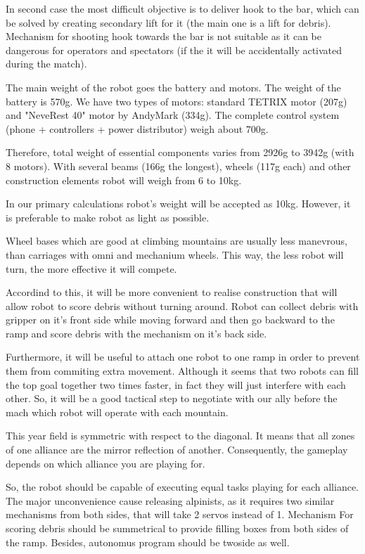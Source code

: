 \begin{enumerate*}
		In second case the most difficult objective is to deliver hook to the bar, which can be solved by creating secondary lift for it (the main one is a lift for debris). Mechanism for shooting hook towards the bar is not suitable as it can be dangerous for operators and spectators (if the it will be accidentally activated during the match).\newline
		\item The main weight of the robot goes the battery and motors. The weight of the battery is 570g. We have two types of motors: standard TETRIX motor (207g) and "NeveRest 40" motor by AndyMark (334g). The complete control system (phone + controllers + power distributor) weigh about 700g.
		
		Therefore, total weight of essential components varies from 2926g to 3942g (with 8 motors). With several beams (166g the longest), wheels (117g each) and other construction elements robot will weigh from 6 to 10kg. 
		
		In our primary calculations robot's weight will be accepted as 10kg. However, it is preferable to make robot as light as possible.\newline
		\item Wheel bases which are good at climbing mountains are usually less manevrous, than carriages with omni and mechanium wheels. This way, the less robot will turn, the more effective it will compete.
		
		Accordind to this, it will be more convenient to realise construction that will allow robot to score debris without turning around. Robot can collect debris with gripper on it's front side while moving forward and then go backward to the ramp and score debris with the mechanism on it's back side.
		
		Furthermore, it will be useful to attach one robot to one ramp in order to prevent them from commiting extra movement. Although it seems that two robots can fill the top goal together two times faster, in fact they will just interfere with each other. So, it will be a good tactical step to negotiate with our ally before the mach which robot will operate with each mountain.\newline
		\item This year field is symmetric with respect to the diagonal. It means that all zones of one alliance are the mirror reflection of another. Consequently, the gameplay depends on which alliance you are playing for.
		
		So, the robot should be capable of executing equal tasks playing for each alliance. The major unconvenience cause releasing alpinists, as it requires two similar mechanisms from both sides, that will take 2 servos instead of 1. Mechanism For scoring debris should be summetrical to provide filling boxes from both sides of the ramp. Besides, autonomus program should be twoside as well.
		
	\end{enumerate*}
	
